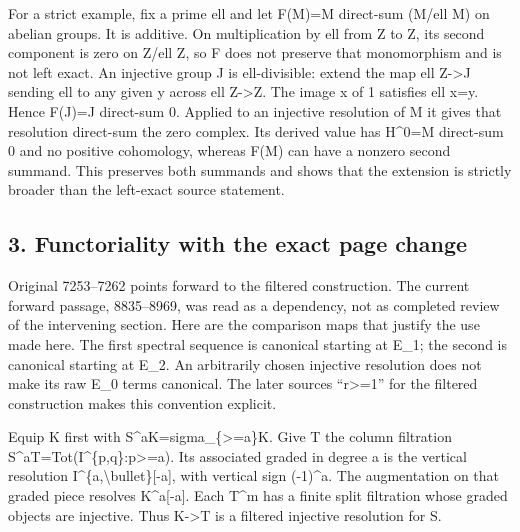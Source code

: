 \documentclass[11pt]{article}
\begin{document}
For a strict example,\allowbreak{} fix a prime ell and let F(M)\allowbreak{}\allowbreak{}=M direct-sum (M/\allowbreak{}ell M)\allowbreak{} on abelian groups. It is additive. On multiplication by ell from Z to Z,\allowbreak{} its second component is zero on Z/\allowbreak{}ell Z,\allowbreak{} so F does not preserve that monomorphism and is not left exact. An injective group J is ell-divisible:\allowbreak{} extend the map ell Z\allowbreak{}->J sending ell to any given y across ell Z\allowbreak{}->Z. The image x of 1 satisfies ell x\allowbreak{}=y. Hence F(J)\allowbreak{}\allowbreak{}=J direct-sum 0. Applied to an injective resolution of M it gives that resolution direct-sum the zero complex. Its derived value has H\textasciicircum{}0\allowbreak{}=M direct-sum 0 and no positive cohomology,\allowbreak{} whereas F(M)\allowbreak{} can have a nonzero second summand. This preserves both summands and shows that the extension is strictly broader than the left-exact source statement.

\subsection{3. Functoriality with the exact page change}\label{proofs-7096-7578-functoriality-with-the-exact-page-change}

Original 7253–\allowbreak{}7262 points forward to the filtered construction. The current forward passage,\allowbreak{} 8835–\allowbreak{}8969,\allowbreak{} was read as a dependency,\allowbreak{} not as completed review of the intervening section. Here are the comparison maps that justify the use made here. The first spectral sequence is canonical starting at E\_\allowbreak{}1; the second is canonical starting at E\_\allowbreak{}2. An arbitrarily chosen injective resolution does not make its raw E\_\allowbreak{}0 terms canonical. The later source\textquotesingle s “r>\allowbreak{}=1” for the filtered construction makes this convention explicit.

Equip K first with S\textasciicircum{}aK\allowbreak{}=sigma\_\allowbreak{}\{>\allowbreak{}=a\}K. Give T the column filtration S\textasciicircum{}aT\allowbreak{}=Tot(I\textasciicircum{}\{p,\allowbreak{}q\}:\allowbreak{}p>\allowbreak{}=a)\allowbreak{}. Its associated graded in degree a is the vertical resolution I\textasciicircum{}\{a,\allowbreak{}\textbackslash{}bullet\}[-a]\allowbreak{},\allowbreak{} with vertical sign (-1)\allowbreak{}\textasciicircum{}a. The augmentation on that graded piece resolves K\textasciicircum{}a[-a]\allowbreak{}. Each T\^{}m has a finite split filtration whose graded objects are injective. Thus K\allowbreak{}->T is a filtered injective resolution for S.
\end{document}
